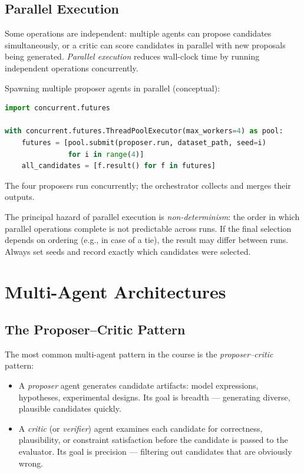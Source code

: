 \subsection{Parallel Execution}

Some operations are independent: multiple agents can propose candidates simultaneously, or a critic can score candidates in parallel with new proposals being generated.
\emph{Parallel execution} reduces wall-clock time by running independent operations concurrently.

\begin{example}
Spawning multiple proposer agents in parallel (conceptual):
\begin{lstlisting}[language=python]
import concurrent.futures

with concurrent.futures.ThreadPoolExecutor(max_workers=4) as pool:
    futures = [pool.submit(proposer.run, dataset_path, seed=i)
               for i in range(4)]
    all_candidates = [f.result() for f in futures]
\end{lstlisting}
The four proposers run concurrently; the orchestrator collects and merges their outputs.
\end{example}

The principal hazard of parallel execution is \emph{non-determinism}: the order in which parallel operations complete is not predictable across runs.
If the final selection depends on ordering (e.g., in case of a tie), the result may differ between runs.
Always set seeds and record exactly which candidates were selected.

\section{Multi-Agent Architectures}
\label{section:MultiAgentArchitectures}

\subsection{The Proposer--Critic Pattern}

The most common multi-agent pattern in the course is the \emph{proposer--critic} pattern:
\begin{itemize}
\item A \emph{proposer} agent generates candidate artifacts: model expressions, hypotheses, experimental designs.
Its goal is breadth — generating diverse, plausible candidates quickly.
\item A \emph{critic} (or \emph{verifier}) agent examines each candidate for correctness, plausibility, or constraint satisfaction before the candidate is passed to the evaluator.
Its goal is precision — filtering out candidates that are obviously wrong.
\end{itemize}

